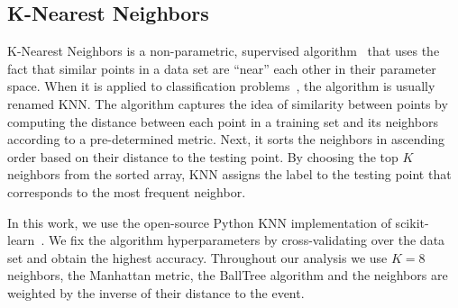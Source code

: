 \subsection*{K-Nearest Neighbors}

K-Nearest Neighbors is a non-parametric, supervised algorithm~\cite{Fix:1951,Cover:1967} that uses the fact that similar points in a data set are ``near'' each other in their
parameter space. When it is applied to classification problems~\cite{Guo:2004}, the algorithm is usually renamed \ac{KNN}. The algorithm captures the idea of similarity between
points by computing the distance between each point in a training set and its neighbors according to a pre-determined metric. Next, it sorts the neighbors in ascending order based on
their distance to the testing point. By choosing the top $K$ neighbors from the sorted array, \ac{KNN} assigns the label to the testing point that corresponds to the most
frequent neighbor.

In this work, we use the open-source Python \ac{KNN} implementation of scikit-learn~\cite{Pedregosa:2011ork}. We fix the algorithm hyperparameters by cross-validating over the data set and obtain the highest accuracy. Throughout our analysis we use $K = 8$ neighbors, the Manhattan metric, the BallTree algorithm and the neighbors are weighted by the inverse of their distance to the event. 





